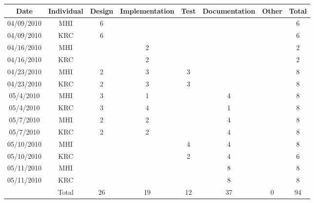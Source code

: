 \begin{center}
\begin{tabular}{c|c|c|c|c|c|c|c}
Date & Individual & Design & Implementation & Test & Documentation & Other & Total\tabularnewline
\hline
\hline 
04/09/2010 & MHI & 6 &  &  &  &  & 6\tabularnewline
\hline 
04/09/2010 & KRC & 6 &  &  &  &  & 6\tabularnewline
\hline 
04/16/2010 & MHI &  & 2 &  &  &  & 2\tabularnewline
\hline 
04/16/2010 & KRC &  & 2 &  &  &  & 2\tabularnewline
\hline 
04/23/2010 & MHI & 2 & 3 & 3 &  &  & 8\tabularnewline
\hline 
04/23/2010 & KRC & 2 & 3 & 3 &  &  & 8\tabularnewline
\hline 
05/4/2010 & MHI & 3 & 1 &  & 4 &  & 8\tabularnewline
\hline 
05/4/2010 & KRC & 3 & 4 &  & 1 &  & 8\tabularnewline
\hline
05/7/2010 & MHI & 2 & 2 &  & 4 &  & 8\tabularnewline
\hline 
05/7/2010 & KRC & 2 & 2 &  & 4 &  & 8\tabularnewline
\hline
05/10/2010 & MHI &  &  & 4 &  4 &  & 8\tabularnewline
\hline 
05/10/2010 & KRC &  &  & 2 &  4 &  & 6\tabularnewline
\hline
05/11/2010 & MHI &  &  &  & 8 &  & 8\tabularnewline
\hline 
05/11/2010 & KRC &  &  &  & 8 &  & 8\tabularnewline
\hline

\hline 
 & Total & 26 & 19 & 12 & 37 & 0 & 94\tabularnewline
\cline{2-8} 
\end{tabular}
\end{center}